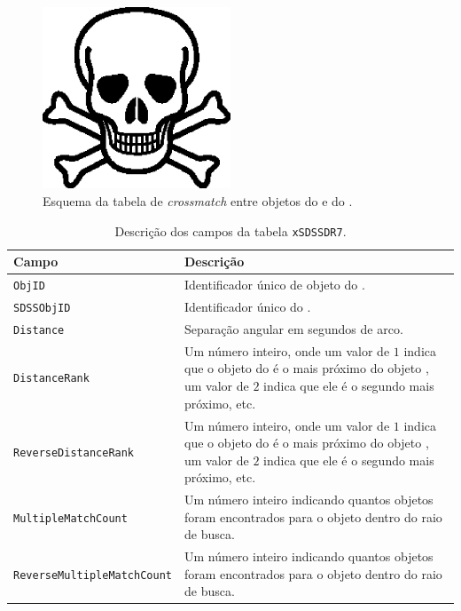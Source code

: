 \begin{figure}
	\includegraphics[width=0.5\textwidth]{figuras/test.eps}
	\caption[Esquema da tabela de {em crossmatch} entre objetos do \galex e do
	\SDSS.]
	{Esquema da tabela de {\em crossmatch} entre objetos do \galex e do
	\SDSS.}
	\label{fig:TabelaxSDSSDR7}
\end{figure}

\begin{table}
	\caption[Descrição dos campos da tabela {\tt xSDSSDR7}.]
	{Descrição dos campos da tabela {\tt xSDSSDR7}.}
	\begin{tabular}{l p{8cm}}
		Campo & Descrição\\
		\midrule
		{\tt ObjID} &
		Identificador único de objeto do \galex.
		\\
		{\tt SDSSObjID} &
		Identificador único do \SDSS.
		\\
		{\tt Distance} &
		Separação angular em segundos de arco.
		\\
		{\tt DistanceRank} &
		Um número inteiro, onde um valor de $1$ indica que o objeto do \galex é o
		mais próximo do objeto \SDSS, um valor de $2$ indica que ele é o segundo mais
		próximo, etc.
		\\
		{\tt ReverseDistanceRank} &
		Um número inteiro, onde um valor de $1$ indica que o objeto do \SDSS é o mais
		próximo do objeto \galex, um valor de $2$ indica que ele é o segundo mais
		próximo, etc.
		\\
		{\tt MultipleMatchCount} &
		Um número inteiro indicando quantos objetos \SDSS foram encontrados para o
		objeto \galex dentro do raio de busca.
		\\
		{\tt ReverseMultipleMatchCount} &
		Um número inteiro indicando quantos objetos \galex foram encontrados para o
		objeto \SDSS dentro do raio de busca.
		\\
	\end{tabular}
	\label{tab:CamposXSDSSDR7}
\end{table}

